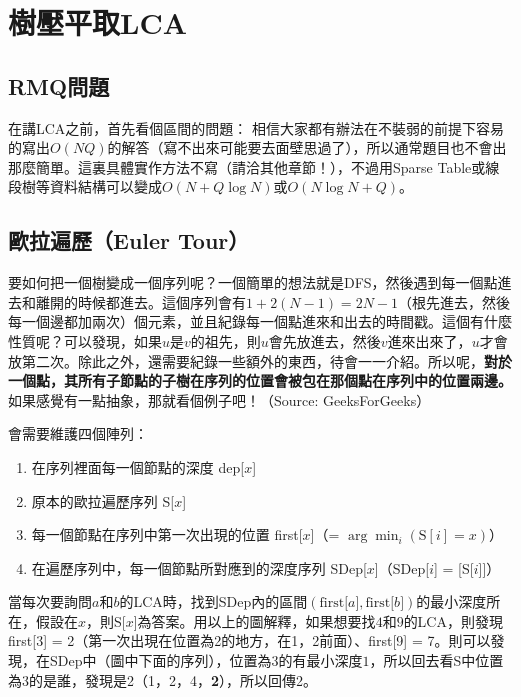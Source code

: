 \documentclass[main.tex]{subfiles}
\begin{document}
	\section{樹壓平取LCA}
		\subsection{RMQ問題}
			在講LCA之前，首先看個區間的問題：
			相信大家都有辦法在不裝弱的前提下容易的寫出$O(NQ)$的解答（寫不出來可能要去面壁思過了），所以通常題目也不會出那麼簡單。這裏具體實作方法不寫（請洽其他章節！），不過用Sparse Table或線段樹等資料結構可以變成$O(N + Q \log N)$或$O(N \log N + Q)$。
		\subsection{歐拉遍歷（Euler Tour）}
			要如何把一個樹變成一個序列呢？一個簡單的想法就是DFS，然後遇到每一個點進去和離開的時候都進去。這個序列會有$1 + 2(N - 1) = 2N - 1$（根先進去，然後每一個邊都加兩次）個元素，並且紀錄每一個點進來和出去的時間戳。這個有什麼性質呢？可以發現，如果$u$是$v$的祖先，則$u$會先放進去，然後$v$進來出來了，$u$才會放第二次。除此之外，還需要紀錄一些額外的東西，待會一一介紹。所以呢，\textbf{對於一個點，其所有子節點的子樹在序列的位置會被包在那個點在序列中的位置兩邊。}如果感覺有一點抽象，那就看個例子吧！（Source: GeeksForGeeks）
			\begin{center}
			\end{center}
			會需要維護四個陣列：
			\begin{enumerate}
				\item 在序列裡面每一個節點的深度 dep[$x$]
				\item 原本的歐拉遍歷序列 S[$x$]
				\item 每一個節點在序列中第一次出現的位置 first[$x$]（= $\arg \min_{i} (\text{S}[i] = x)$）
				\item 在遍歷序列中，每一個節點所對應到的深度序列 SDep[$x$]（SDep[$i$] = [S[$i$]]）
			\end{enumerate}
			當每次要詢問$a$和$b$的LCA時，找到SDep內的區間$(\text{first[}a\text{]}, \text{first[}b\text{]})$的最小深度所在，假設在$x$，則S[$x$]為答案。用以上的圖解釋，如果想要找$4$和$9$的LCA，則發現first[$3$] = 2（第一次出現在位置為2的地方，在1，2前面）、first[9] = 7。則可以發現，在SDep中（圖中下面的序列），位置為$3$的有最小深度$1$，所以回去看S中位置為3的是誰，發現是2（1，2，4，\textbf{2}），所以回傳2。
\end{document}
